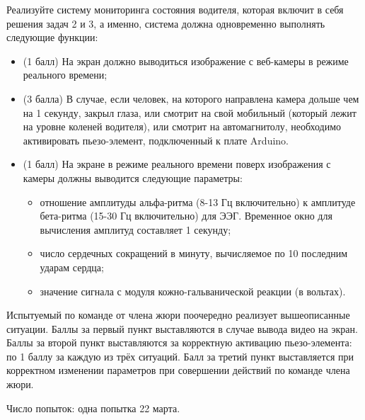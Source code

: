 
Реализуйте систему мониторинга состояния водителя, которая включит в себя решения задач 2 и 3, а именно, система должна одновременно выполнять следующие функции:
\begin{itemize}
\item (1 балл) На экран должно выводиться изображение с веб-камеры в режиме реального времени;
\item (3 балла) В случае, если человек, на которого направлена камера дольше чем на 1 секунду, закрыл глаза, или смотрит на свой мобильный (который лежит на уровне коленей водителя), или смотрит на автомагнитолу, необходимо активировать пьезо-элемент, подключенный к плате Arduino.
\item (1 балл) На экране в режиме реального времени поверх изображения с камеры должны выводится следующие параметры:
\begin{itemize}
    \item отношение амплитуды альфа-ритма (8-13 Гц включительно) к амплитуде бета-ритма (15-30 Гц включительно) для ЭЭГ. Временное окно для вычисления амплитуд составляет 1 секунду;
    \item число сердечных сокращений в минуту, вычисляемое по 10 последним ударам сердца;
    \item значение сигнала с модуля кожно-гальванической реакции (в вольтах).
\end{itemize}
\end{itemize}

\markSection

Испытуемый по команде от члена жюри поочередно реализует вышеописанные ситуации. Баллы за первый пункт выставляются в случае вывода видео на экран. Баллы за второй пункт выставляются за корректную активацию пьезо-элемента: по 1 баллу за каждую из трёх ситуаций. Балл за третий пункт выставляется при корректном изменении параметров при совершении действий по команде члена жюри. 

Число попыток: одна попытка 22 марта.
